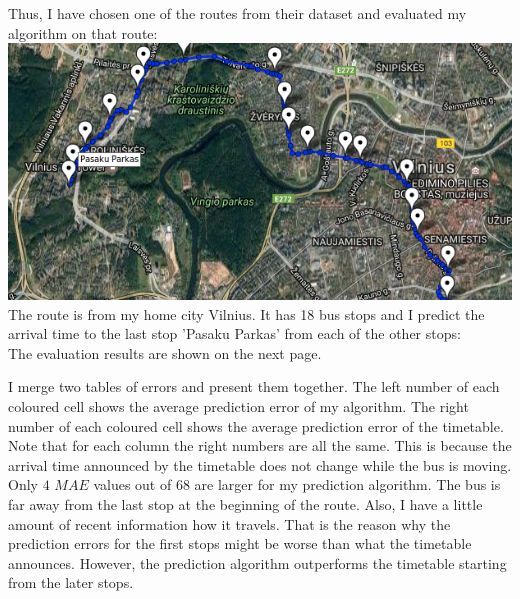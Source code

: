\documentclass[12pt,a4paper,oneside,openright]{report}
\begin{document}
Thus, I have chosen one of the routes from their dataset and evaluated my algorithm
on that route: \\

\includegraphics[width=\textwidth]{figs/vilnius_route.png} \\

The route is from my home city Vilnius. It has 18 bus stops and
I predict the arrival time to the last stop 'Pasaku Parkas' from each
of the other stops: \\


The evaluation results are shown on the next page.

\newpage
I merge two tables of errors and present them together. The left number of each coloured cell shows the
average prediction error of my algorithm. The right number of each coloured cell
shows the average prediction error of the timetable. \\


Note that for each column the right numbers are all the same. This is because the
arrival time announced by the timetable does not change while the bus is moving. \\

Only $4$ $MAE$ values out of $68$ are larger for my prediction algorithm. The bus is far
away from the last stop at the beginning of the route. Also, I have a little amount
of recent information how it travels. That is the reason why the prediction errors
for the first stops might be worse than what the timetable announces. However, the prediction
algorithm outperforms the timetable starting from the later stops. \\
\end{document}

